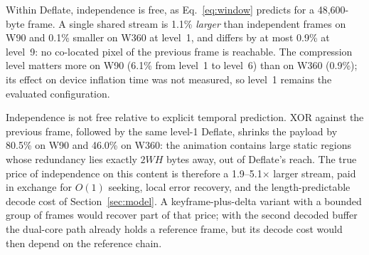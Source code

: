 \documentclass[11pt,twocolumn]{article}
\begin{document}
\begin{table}[t]
\centering
\caption{Deflate payload bytes for the evaluated frames under alternative
organisations, relative to the shipped independent level-1 payloads of the
same window.}
\label{tab:independence}
\end{table}

Within Deflate, independence is free, as Eq.~\eqref{eq:window} predicts for a
48,600-byte frame.  A single shared stream is 1.1\% \emph{larger} than
independent frames on W90 and 0.1\% smaller on W360 at level~1, and differs
by at most 0.9\% at level~9: no co-located pixel of the previous frame is
reachable.  The compression level matters more on W90 (6.1\% from level~1 to
level~6) than on W360 (0.9\%); its effect on device inflation time was not
measured, so level~1 remains the evaluated configuration.

Independence is not free relative to explicit temporal prediction.  XOR
against the previous frame, followed by the same level-1 Deflate, shrinks the
payload by 80.5\% on W90 and 46.0\% on W360: the animation contains large
static regions whose redundancy lies exactly $2WH$ bytes away, out of
Deflate's reach.  The true price of independence on this content is therefore
a 1.9--5.1$\times$ larger stream, paid in exchange for $O(1)$ seeking, local
error recovery, and the length-predictable decode cost of
Section~\ref{sec:model}.  A keyframe-plus-delta variant with a bounded group
of frames would recover part of that price; with the second decoded buffer the
dual-core path already holds a reference frame, but its decode cost would then
depend on the reference chain.
\end{document}

